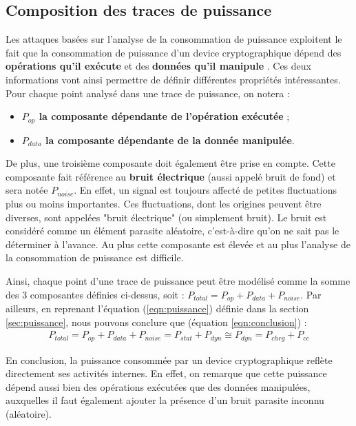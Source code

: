 \documentclass[oneside]{book}
\begin{document}
\subsection{Composition des traces de puissance}
Les attaques basées sur l'analyse de la consommation de puissance exploitent le fait que la consommation de puissance d'un device cryptographique dépend des \textbf{opérations qu'il exécute} et des \textbf{données qu'il manipule} \cite{mangard_power_2007}. Ces deux informations vont ainsi permettre de définir différentes propriétés intéressantes. Pour chaque point analysé dans une trace de puissance, on notera :
\begin{itemize}
\item \textbf{$P_{op}$ la composante dépendante de l'opération exécutée} ;
\item \textbf{$P_{data}$ la composante dépendante de la donnée manipulée}. \\
\end{itemize}
De plus, une troisième composante doit également être prise en compte. Cette composante fait référence au \textbf{bruit électrique} (aussi appelé bruit de fond) et sera notée \textbf{$P_{noise}$}. En effet, un signal est toujours affecté de petites fluctuations plus ou moins importantes. Ces fluctuations, dont les origines peuvent être diverses, sont appelées "bruit électrique" (ou simplement bruit). Le bruit est considéré comme un élément parasite aléatoire, c'est-à-dire qu'on ne sait pas le déterminer à l'avance. Au plus cette composante est élevée et au plus l'analyse de la consommation de puissance est difficile.

\hspace{-0.5cm}Ainsi, chaque point d'une trace de puissance peut être modélisé comme la somme des 3 composantes définies ci-dessus, soit : 
$P_{total} = P_{op} + P_{data} + P_{noise}$. Par ailleurs, en reprenant l'équation (\ref{eqn:puissance}) définie dans la section \ref{sec:puissance}, nous pouvons conclure que (équation \ref{eqn:conclusion}) :
\begin{gather}
	P_{total} = P_{op} + P_{data} + P_{noise} = P_{stat} + P_{dyn} \cong  P_{dyn} = P_{chrg} + P_{cc}\label{eqn:conclusion}
\end{gather}

En conclusion, la puissance consommée par un device cryptographique reflète directement ses activités internes. En effet, on remarque que cette puissance dépend aussi bien des opérations exécutées que des données manipulées, auxquelles il faut également ajouter la présence d'un bruit parasite inconnu (aléatoire). 
\end{document}
